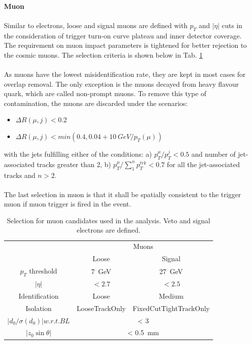 \noindent
\\{\bf Muon}
\\
\\Similar to electrons, loose and signal muons are defined with $p_{T}$ and $|\eta|$ cuts in the consideration of trigger turn-on curve plateau and inner detector coverage. The requirement on muon impact parameters is tightened for better rejection to the cosmic muons. The selection criteria is shown below in Tab. \ref{Tab:mudefin}
\\
\\As muons have the lowest misidentification rate, they are kept in most cases for overlap removal. The only exception is the muons decayed from heavy flavour quark, which are called non-prompt muons. To remove this type of contamination, the muons are discarded under the scenarios:
\begin{itemize}
	\item $\Delta R(\mu,j)<0.2$
	\item $\Delta R(\mu,j)<min(0.4,0.04+10~GeV/p_{T}(\mu))$ 
\end{itemize}
\noindent
with the jets fulfilling either of the conditions: a) $p_{T}^{\mu}/p_{T}^j<0.5$ and number of jet-associated tracks greater than 2, b) $p_{T}^{\mu}/\sum^{n}_{1} p_{T}^{trk}<0.7$ for all the jet-associated tracks and $n>2$.
\\
\\The last selection in muon is that it shall be spatially consistent to the trigger muon if muon trigger is fired in the event. 
\begin{table}[htb]
	\caption{Selection for muon candidates used in the analysis. Veto and signal electrons are defined.}\label{Tab:mudefin}
	\centering
	\begin{tabular}{|c||c|c|}
   \hline
& \multicolumn{2}{c|}{Muons}\\
\cline{2-3}
&  Loose & Signal  \\
\hline
$p_T$ threshold &  7~GeV & 27~GeV  \\
\hline
$| \eta |$      &  $< 2.7$ & $< 2.5$   \\
\hline
Identification  &  Loose & Medium  \\
\hline
Isolation       &   LooseTrackOnly & FixedCutTightTrackOnly  \\
\hline
$|d_0/\sigma(d_0)| w.r.t. BL$ &   \multicolumn{2}{|c|}{< 3} \\
\hline
$|z_0\sin\theta| $ &   \multicolumn{2}{|c|}{< 0.5~mm} \\
\hline
	\end{tabular}
\end{table}
